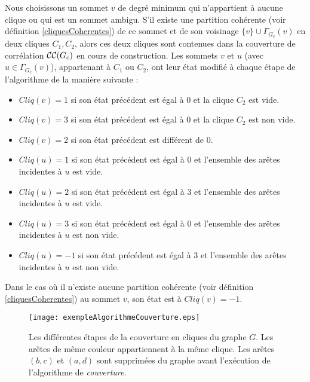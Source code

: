 Nous choisissons un sommet $v$ de degr\'e minimum qui n'appartient \`a aucune clique ou qui est un sommet ambigu. 
S'il existe une partition coh\'erente (voir d\'efinition \ref{cliquesCoherentes}) de ce sommet et de son voisinage $\{v\} \cup \Gamma_{G_c}(v)$ en deux cliques $C_1, C_2$, alors ces deux cliques sont contenues dans la couverture de corr\'elation ${\cal CC}(G_c)$ en cours de construction. Les sommets $v$ et $u$ (avec $u \in  \Gamma_{G_c}(v)$), appartenant \`a $C_1$ ou $C_2$, ont leur \'etat modifi\'e \`a chaque \'etape de l'algorithme de la mani\`ere suivante :
\begin{itemize}
\item $Cliq(v) = 1$ si son \'etat pr\'ec\'edent est \'egal \`a $0$ et la clique $C_2$ est vide. 
\item $Cliq(v) = 3$ si son \'etat pr\'ec\'edent est \'egal \`a $0$ et la clique $C_2$ est non vide. 
\item $Cliq(v) = 2$ si son \'etat pr\'ec\'edent est diff\'erent de $0$.
\item $Cliq(u) = 1$ si son \'etat pr\'ec\'edent est \'egal \`a $0$ et l'ensemble des ar\^etes incidentes \`a $u$ est vide.
\item $Cliq(u) = 2$ si son \'etat pr\'ec\'edent est \'egal \`a $3$ et l'ensemble des ar\^etes incidentes \`a $u$ est vide.
\item $Cliq(u) = 3$ si son \'etat pr\'ec\'edent est \'egal \`a $0$ et l'ensemble des ar\^etes incidentes \`a $u$ est non vide.
\item $Cliq(u) = -1$ si son \'etat pr\'ec\'edent est \'egal \`a $3$ et l'ensemble des ar\^etes incidentes \`a $u$ est non vide.
\end{itemize} 
Dans le cas o\`u il n'existe aucune partition coh\'erente (voir d\'efinition \ref{cliquesCoherentes}) au sommet $v$, son \'etat est \`a $Cliq(v)=-1$.
\newline
\begin{figure}[htb!]
	\centering
	\texttt{[image: exempleAlgorithmeCouverture.eps]}\vspace{-0.5em}
	\caption{ Les diff\'erentes \'etapes de la couverture en cliques du graphe $G$. Les ar\^etes de m\^eme couleur appartiennent \`a la m\^eme clique.  Les ar\^etes $(b,c)$ et $(a,d)$ sont supprim\'ees du graphe avant l'ex\'ecution de l'algorithme de {\em couverture}.  }\vspace{-0.5em}
	\label{exempleAlgorithmeCouverture}
\end{figure}
